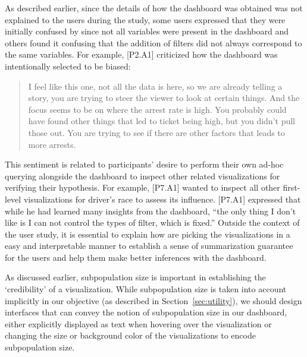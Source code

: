\par As described earlier, since the details of how the dashboard was obtained was not explained to the users during the study, some users expressed that they were initially confused by \system since not all variables were present in the dashboard and others found it confusing that the addition of filters did not always correspond to the same variables. For example, [P2.A1] criticized how the dashboard was intentionally selected to be biased:
\begin{quote}
I feel like this one, not all the data is here, so we are already telling a story, you are trying to steer the viewer to look at certain things. And the focus seems to be on where the arrest rate is high. You probably could have found other things that led to ticket being high, but you didn't pull those out. You are trying to see if there are other factors that leads to more arrests.
\end{quote}
\npar This sentiment is related to participants' desire to perform their own ad-hoc querying alongside the dashboard to inspect other related visualizations for verifying their hypothesis. For example, [P7.A1] wanted to inspect all other first-level visualizations for driver's race to assess its influence. [P7.A1] expressed that while he had learned many insights from the dashboard, ``the only thing I don't like is I can not control the types of filter, which is fixed.'' Outside the context of the user study, it is essential to explain how \system are picking the visualizations in a easy and interpretable manner to establish a sense of summarization guarantee for the users and help them make better inferences with the dashboard.
\par As discussed earlier, subpopulation size is important in establishing the `credibility' of a visualization. While subpopulation size is taken into account implicitly in our objective (as described in Section~\ref{sec:utility}), we should design interfaces that can convey the notion of subpopulation size in our dashboard, either explicitly displayed as text when hovering over the visualization or changing the size or background color of the visualizations to encode subpopulation size.
